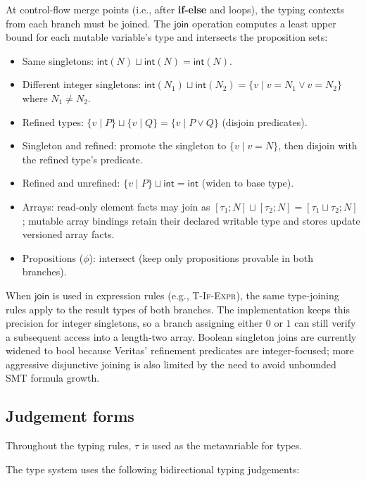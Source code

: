 At control-flow merge points (i.e., after \textbf{if-else} and loops), the typing contexts from each branch must be joined. The $\textsf{join}$ operation computes a least upper bound for each mutable variable's type and intersects the proposition sets:

\begin{itemize}
    \item Same singletons: $\textsf{int}(N) \sqcup \textsf{int}(N) = \textsf{int}(N)$.
    \item Different integer singletons: $\textsf{int}(N_1) \sqcup \textsf{int}(N_2) = \{v \mid v = N_1 \vee v = N_2\}$ where $N_1 \ne N_2$.
    \item Refined types: $\{v \mid P\} \sqcup \{v \mid Q\} = \{v \mid P \vee Q\}$ (disjoin predicates).
    \item Singleton and refined: promote the singleton to $\{v \mid v = N\}$, then disjoin with the refined type's predicate.
    \item Refined and unrefined: $\{v \mid P\} \sqcup \textsf{int} = \textsf{int}$ (widen to base type).
    \item Arrays: read-only element facts may join as $[\tau_1; N] \sqcup [\tau_2; N] = [\tau_1 \sqcup \tau_2; N]$; mutable array bindings retain their declared writable type and stores update versioned array facts.
    \item Propositions ($\phi$): intersect (keep only propositions provable in both branches).
\end{itemize}

\noindent When $\textsf{join}$ is used in expression rules (e.g., \textsc{T-If-Expr}), the same type-joining rules apply to the result types of both branches. The implementation keeps this precision for integer singletons, so a branch assigning either $0$ or $1$ can still verify a subsequent access into a length-two array. Boolean singleton joins are currently widened to \textsf{bool} because Veritas' refinement predicates are integer-focused; more aggressive disjunctive joining is also limited by the need to avoid unbounded SMT formula growth.

\subsection{Judgement forms}\label{sec:judgement-forms}

Throughout the typing rules, $\tau$ is used as the metavariable for types.

The type system uses the following bidirectional typing judgements:


